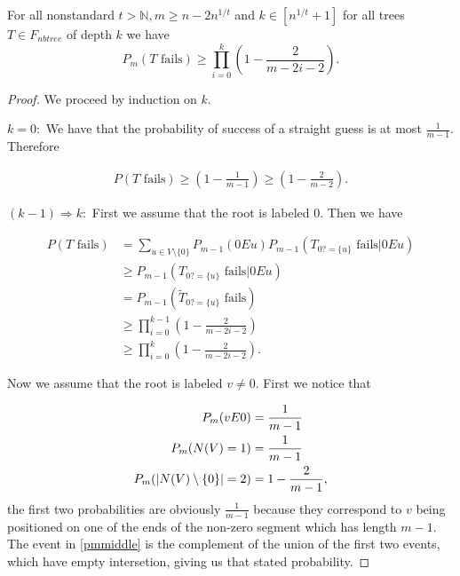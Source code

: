 \begin{lemm}
For all nonstandard $t>\mathbb{N},m\geq n-2n^{1/t}$ and $k\in [n^{1/t}+1]$ for all trees $T\in F_{nbtree}$ of depth $k$ we have
\[
P_m(\text{$T$ fails})\geq \prod_{i=0}^k\left (1-\frac{2}{m-2i-2}\right ).
\]
\end{lemm}
\begin{proof}
We proceed by induction on $k$. 

$k=0:$ We have that the probability of success of a straight guess is at most $\frac{1}{m-1}$. Therefore

\begin{align}
P(\text{$T$ fails})\geq \left (1-\frac{1}{m-1}\right ) \geq \left(1-\frac{2}{m-2}\right).
\end{align}

$(k-1) \Rightarrow k:$ First we assume that the root is labeled $0$. Then we have 

\begin{align}
P(\text{$T$ fails})&=\sum_{u\in V\setminus\{0\}}P_{m-1}(0Eu)P_{m-1}(T_{0?=\{u\}}\text{ fails}|0Eu)\\
&\geq P_{m-1}(T_{0?=\{u\}}\text{ fails}|0Eu)\\
&= P_{m-1}(\tilde T_{0?=\{u\}}\text{ fails})\\
&\geq \prod_{i=0}^{k-1}\left(1-\frac{2}{m-2i-2}\right)\\
&\geq \prod_{i=0}^{k}\left(1-\frac{2}{m-2i-2}\right).
\end{align}

Now we assume that the root is labeled $v\not= 0$. First we notice that

\begin{align}
P_m(vE0)&=\frac{1}{m-1}\\
P_m(N(V)=1)&=\frac{1}{m-1}\\
P_m(\left|{N(V)\setminus\{0\}}\right|=2)&=1-\frac{2}{m-1},\label{pmmiddle}
\end{align}
the first two probabilities are obviously $\frac{1}{m-1}$ because they correspond to $v$ being positioned on one of the ends of the non-zero segment which has length $m-1$. The event in \eqref{pmmiddle} is the complement of the union of the first two events, which have empty intersetion, giving us that stated probability.


\end{proof}
